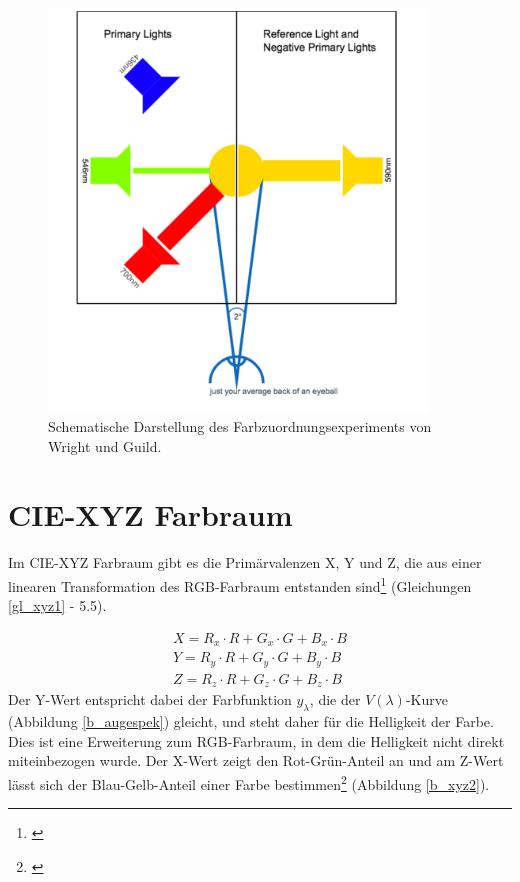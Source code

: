 \begin{figure}[H]     %
\centering
\includegraphics[width=0.9\textwidth]{bilder/rgb2} 
\caption {Schematische Darstellung des Farbzuordnungsexperiments von Wright und Guild\protect\footnotemark .}\label{b_rgb2}
\end{figure}



\section{CIE-XYZ Farbraum} \label{sec_xyz}
Im CIE-XYZ Farbraum gibt es die Primärvalenzen X, Y und Z, die aus einer linearen Transformation des RGB-Farbraum entstanden sind\footnote{\cite[76-77]{greule}} (Gleichungen  \ref{gl_xyz1} - 5.5).

\begin{eqnarray}\label{gl_xyz1}
		X = R_{x}\cdot R + G_{x}\cdot G + B_{x}\cdot B\\
		Y = R_{y}\cdot R + G_{y}\cdot G + B_{y}\cdot B\\
		Z = R_{z}\cdot R + G_{z}\cdot G + B_{z}\cdot B
\end{eqnarray}
Der Y-Wert entspricht dabei der Farbfunktion $y_{\lambda}$, die der $V(\lambda)$-Kurve (Abbildung \ref{b_augespek}) gleicht, und steht daher für die Helligkeit der Farbe. Dies ist eine Erweiterung zum RGB-Farbraum, in dem die Helligkeit nicht direkt miteinbezogen wurde. Der X-Wert zeigt den Rot-Grün-Anteil an und am Z-Wert lässt sich der Blau-Gelb-Anteil einer Farbe bestimmen\footnote{\cite[72]{mueller}} (Abbildung \ref{b_xyz2}).

